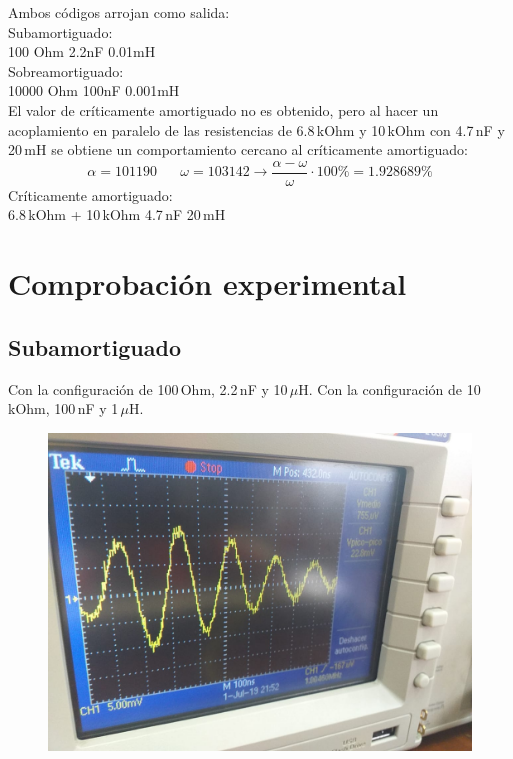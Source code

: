 \documentclass[a4paper,12pt]{report}
\begin{document}
Ambos códigos arrojan como salida:\\
Subamortiguado:\\
100 Ohm \hspace{10pt} 2.2nF \hspace{10pt} 0.01mH\\
Sobreamortiguado:\\
10000 Ohm \hspace{10pt} 100nF \hspace{10pt} 0.001mH\\
El valor de críticamente amortiguado no es obtenido, pero al hacer un acoplamiento en paralelo de las resistencias de 6.8$\,$kOhm y 10$\,$kOhm con 4.7$\,$nF y 20$\,$mH se obtiene un comportamiento cercano al críticamente amortiguado:
$$
\alpha = 101190 \hspace{20pt} \omega = 103142 \longrightarrow \frac{\alpha - \omega}{\omega} \cdot 100\% = 1.928689\%
$$
Críticamente amortiguado:\\
6.8$\,$kOhm + 10$\,$kOhm \hspace{10pt} 4.7$\,$nF \hspace{10pt} 20$\,$mH
\section{Comprobación experimental}
\subsection{Subamortiguado}
Con la configuración de 100$\,$Ohm, 2.2$\,$nF y 10$\,\mu$H.
Con la configuración de 10$\,$kOhm, 100$\,$nF y 1$\,\mu$H.
\begin{figure}[H]
\begin{center}
\includegraphics[scale=0.24]{sub.jpeg}
\end{center}
\end{figure}
\end{document}
